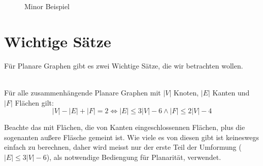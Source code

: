 \documentclass[runningheads]{llncs}
\begin{document}
\begin{figure}
    \begin{subfigure}{.50\textwidth}
        \centering
        \caption{}
    \end{subfigure}
    \begin{subfigure}{.48\textwidth}
        \centering
        \caption{}
    \end{subfigure}
    \caption{Minor Beispiel}
\end{figure}
\FloatBarrier
\section{Wichtige Sätze}
Für Planare Graphen gibt es zwei Wichtige Sätze, die wir betrachten wollen.
\begin{theorem}\\
    Für alle zusammenhängende Planare Graphen mit $|V|$ Knoten, $|E|$ Kanten und $|F|$ Flächen gilt:\\
    \[ |V|-|E|+|F|=2 \Leftrightarrow |E| \leq 3|V| - 6 \land |F| \leq 2|V| - 4 \]
\end{theorem}
Beachte das mit Flächen, die von Kanten eingeschlossennen Flächen, plus die sogenanten außere Fläsche gemeint ist.
Wie viele es von diesen gibt ist keineswegs einfach zu berechnen, daher wird meisst nur der erste Teil der Umformung
($|E| \leq 3|V| - 6$), als notwendige Bediengung für Planarität, verwendet.
\end{document}
